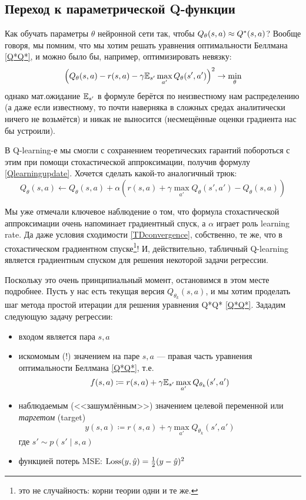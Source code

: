 \subsection{Переход к параметрической Q-функции}\label{toregression}

Как обучать параметры $\theta$ нейронной сети так, чтобы $Q_{\theta}(s, a) \HM \approx Q^*(s, a)$? Вообще говоря, мы помним, что мы хотим решать уравнения оптимальности Беллмана \eqref{Q*Q*}, и можно было бы, например, оптимизировать невязку:
$$\left( Q_{\theta}(s, a) - r(s, a) - \gamma \mathbb{E}_{s'} \max_{a'} Q_{\theta}(s', a') \right)^2 \to \min_{\theta}$$
однако мат.ожидание $\mathbb{E}_{s'}$ в формуле берётся по неизвестному нам распределению (а даже если известному, то почти наверняка в сложных средах аналитически ничего не возьмётся) и никак не выносится (несмещённые оценки градиента нас бы устроили).

В Q-learning-е мы смогли с сохранением теоретических гарантий побороться с этим при помощи стохастической аппроксимации, получив формулу \eqref{Qlearningupdate}. Хочется сделать какой-то аналогичный трюк:
$$Q_{\theta}(s, a) \leftarrow Q_{\theta}(s, a) + \alpha\left( r(s, a) + \gamma \max_{a'} Q_{\theta}(s', a') - Q_{\theta}(s, a) \right)$$

Мы уже отмечали ключевое наблюдение о том, что формула стохастической аппроксимации очень напоминает градиентный спуск, а $\alpha$ играет роль learning rate. Да даже условия сходимости \ref{TDconvergence}, собственно, те же, что в стохастическом градиентном спуске\footnote{это не случайность: корни теории одни и те же.}! И, действительно, табличный Q-learning является градиентным спуском для решения некоторой задачи регрессии.

Поскольку это очень принципиальный момент, остановимся в этом месте подробнее. Пусть у нас есть текущая версия $Q_{\theta_k}(s, a)$, и мы хотим проделать шаг метода простой итерации для решения уравнения Q*Q* \eqref{Q*Q*}. Зададим следующую задачу регрессии:
\begin{itemize}
\item входом является пара $s, a$
\item искомомым (!) значением на паре $s, a$ --- правая часть уравнения оптимальности Беллмана \eqref{Q*Q*}, т.е.
$$f(s, a) \coloneqq r(s, a) + \gamma \mathbb{E}_{s'} \max_{a'} Q_{\theta_k}(s', a') $$
\item наблюдаемым (<<зашумлённым>>) значением целевой переменной или \emph{таргетом} (target)
\begin{equation}\label{guess}
y(s, a) \coloneqq r(s, a) + \gamma \max_{a'} Q_{\theta_k}(s', a')
\end{equation}
где $s' \sim p(s' \mid s, a)$
\item функцией потерь MSE:
$\operatorname{Loss}(y, \hat{y}) = \frac{1}{2}(y - \hat{y})^2$
\end{itemize}


